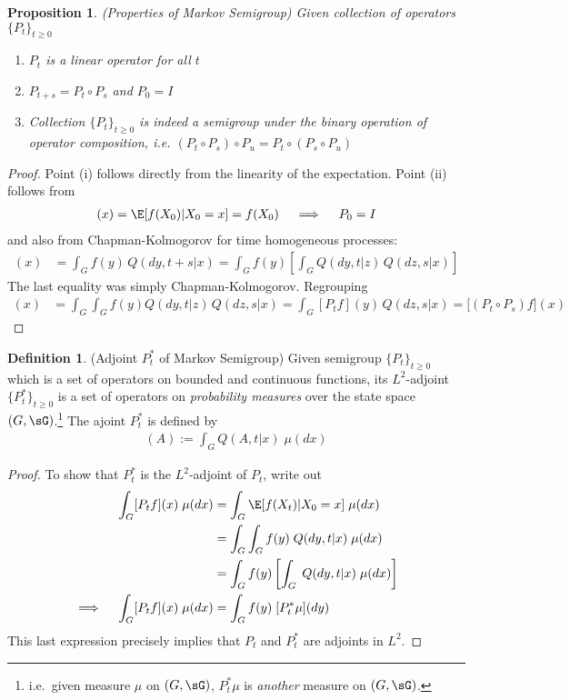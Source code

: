 \documentclass[12pt]{article}
\theoremstyle{plain}
\newtheorem{prop}[thm]{Proposition}
\theoremstyle{definition}
\newtheorem{defn}[thm]{Definition}
\theoremstyle{remark}
\begin{document}
\begin{prop}\emph{(Properties of Markov Semigroup)}
\label{markovsemiprop}
Given collection of operators $\{P_t\}_{t\geq 0}$
\begin{enumerate}[label=\emph{(\roman*)}]
  \item $P_t$ is a linear operator for all $t$
  \item $P_{t+s}=P_t\circ P_s$ and $P_0=I$
  \item Collection $\{P_t\}_{t\geq 0}$ is indeed a semigroup under
    the binary operation of operator composition, i.e.
    $(P_t\circ P_s) \circ P_u = P_t\circ (P_s \circ P_u)$
\end{enumerate}
\end{prop}
\begin{proof}
Point (i) follows directly from the linearity of the expectation.
Point (ii) follows from
\begin{align*}
  [P_0f](x)
  =
  \E[f(X_0)|X_0=x]
  = f(X_0)
  \quad\implies\quad
  P_0=I
\end{align*}
and also from Chapman-Kolmogorov for time homogeneous processes:
\begin{align*}
  [P_{t+s}f](x)
  &=
  \int_G
  f(y)
  \,Q(dy,t+s|x)
  =
  \int_G
  f(y)
  \left[
  \int_{G}
  Q(dy,t|z)
  \, Q(dz,s|x)
  \right]
\end{align*}
The last equality was simply Chapman-Kolmogorov.
Regrouping
\begin{align*}
  [P_{t+s}f](x)
  &=
  \int_G
  \int_{G}
  f(y)
  Q(dy,t|z)
  \, Q(dz,s|x)
  =
  \int_G
  [P_tf](y)
  \, Q(dz,s|x)
  =
  \big[
  (P_t\circ P_s)
  f
  \big](x)
\end{align*}
\end{proof}

\begin{defn}(Adjoint $P_t^*$ of Markov Semigroup)
Given semigroup $\{P_t\}_{t\geq 0}$ which is a set of operators on
bounded and continuous functions, its $L^2$-adjoint
$\{P_t^*\}_{t\geq 0}$ is a set of operators on
\emph{probability measures} over the state space $(G,\sG)$.\footnote{%
  i.e.\ given measure $\mu$ on $(G,\sG)$, $P_t^*\mu$ is \emph{another}
  measure on $(G,\sG)$.
}
The ajoint $P_t^*$ is defined by
\begin{align}
  [P_t^*\mu](A)
  :=
  \int_G
  Q(A,t|x)
  \;\mu(dx)
  \label{Padjoint}
\end{align}
\end{defn}
\begin{proof}
To show that $P_t^*$ is the $L^2$-adjoint of $P_t$, write out
\begin{align*}
  \int_G
  [P_tf](x)
  \;\mu(dx)
  &=
  \int_G
  \E[f(X_t)|X_0=x]
  \;\mu(dx)
  \\
  &=
  \int_G
  \int_G
  f(y)
  \;Q(dy,t|x)
  \;\mu(dx)
  \\
  &=
  \int_G
  f(y)
  \left[
  \int_G
  \;Q(dy,t|x)
  \;\mu(dx)
  \right]
  \\
  \implies\quad
  \int_G
  [P_tf](x)
  \;\mu(dx)
  &=
  \int_G
  f(y)
  \;
  [P_t^*\mu](dy)
\end{align*}
This last expression precisely implies that $P_t$ and $P_t^*$ are
adjoints in $L^2$.
\end{proof}
\end{document}
